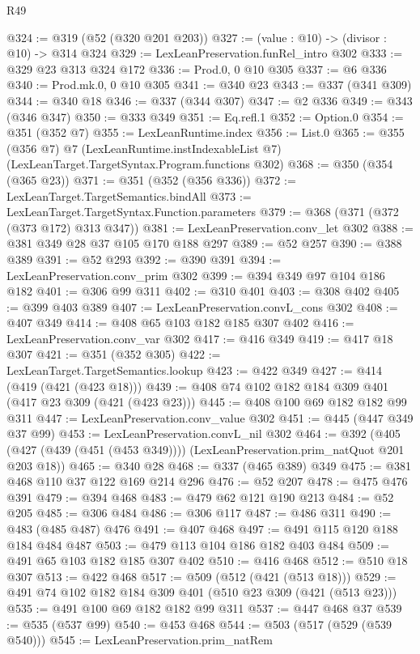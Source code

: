 \begin{lexlean}{R49}
\begin{coremodule}
@324 := @319 (@52 (@320 @201 @203))
@327 := (value : @10) -> (divisor : @10) -> @314 @324
@329 := LexLeanPreservation.funRel_intro @302
@333 := @329 @23 @313 @324 @172
@336 := Prod.{0, 0} @10 @305
@337 := @6 @336
@340 := Prod.mk.{0, 0} @10 @305
@341 := @340 @23
@343 := @337 (@341 @309)
@344 := @340 @18
@346 := @337 (@344 @307)
@347 := @2 @336
@349 := @343 (@346 @347)
@350 := @333 @349
@351 := Eq.refl.{1}
@352 := Option.{0}
@354 := @351 (@352 @7)
@355 := LexLeanRuntime.index
@356 := List.{0}
@365 := @355
    (@356 @7)
    @7
    (LexLeanRuntime.instIndexableList @7)
    (LexLeanTarget.TargetSyntax.Program.functions @302)
@368 := @350 (@354 (@365 @23))
@371 := @351 (@352 (@356 @336))
@372 := LexLeanTarget.TargetSemantics.bindAll
@373 := LexLeanTarget.TargetSyntax.Function.parameters
@379 := @368 (@371 (@372 (@373 @172) @313 @347))
@381 := LexLeanPreservation.conv_let @302
@388 := @381 @349 @28 @37 @105 @170 @188 @297
@389 := @52 @257
@390 := @388 @389
@391 := @52 @293
@392 := @390 @391
@394 := LexLeanPreservation.conv_prim @302
@399 := @394 @349 @97 @104 @186 @182
@401 := @306 @99 @311
@402 := @310 @401
@403 := @308 @402
@405 := @399 @403 @389
@407 := LexLeanPreservation.convL_cons @302
@408 := @407 @349
@414 := @408 @65 @103 @182 @185 @307 @402
@416 := LexLeanPreservation.conv_var @302
@417 := @416 @349
@419 := @417 @18 @307
@421 := @351 (@352 @305)
@422 := LexLeanTarget.TargetSemantics.lookup
@423 := @422 @349
@427 := @414 (@419 (@421 (@423 @18)))
@439 := @408 @74 @102 @182 @184 @309 @401 (@417 @23 @309 (@421 (@423 @23)))
@445 := @408 @100 @69 @182 @182 @99 @311
@447 := LexLeanPreservation.conv_value @302
@451 := @445 (@447 @349 @37 @99)
@453 := LexLeanPreservation.convL_nil @302
@464 := @392
    (@405 (@427 (@439 (@451 (@453 @349)))) (LexLeanPreservation.prim_natQuot @201 @203 @18))
@465 := @340 @28
@468 := @337 (@465 @389) @349
@475 := @381 @468 @110 @37 @122 @169 @214 @296
@476 := @52 @207
@478 := @475 @476 @391
@479 := @394 @468
@483 := @479 @62 @121 @190 @213
@484 := @52 @205
@485 := @306 @484
@486 := @306 @117
@487 := @486 @311
@490 := @483 (@485 @487) @476
@491 := @407 @468
@497 := @491 @115 @120 @188 @184 @484 @487
@503 := @479 @113 @104 @186 @182 @403 @484
@509 := @491 @65 @103 @182 @185 @307 @402
@510 := @416 @468
@512 := @510 @18 @307
@513 := @422 @468
@517 := @509 (@512 (@421 (@513 @18)))
@529 := @491 @74 @102 @182 @184 @309 @401 (@510 @23 @309 (@421 (@513 @23)))
@535 := @491 @100 @69 @182 @182 @99 @311
@537 := @447 @468 @37
@539 := @535 (@537 @99)
@540 := @453 @468
@544 := @503 (@517 (@529 (@539 @540)))
@545 := LexLeanPreservation.prim_natRem

\end{coremodule}
\end{lexlean}
